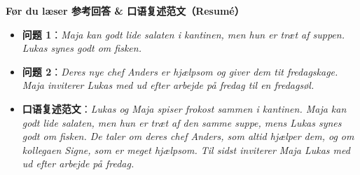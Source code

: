 \begin{answerbox}
\textbf{Før du læser 参考回答 \& 口语复述范文（Resumé）}
\begin{itemize}
  \item \textbf{问题 1}：\textit{Maja kan godt lide salaten i kantinen, men hun er træt af suppen. Lukas synes godt om fisken.}
  \item \textbf{问题 2}：\textit{Deres nye chef Anders er hjælpsom og giver dem tit fredagskage. Maja inviterer Lukas med ud efter arbejde på fredag til en fredagsøl.}
  \item \textbf{口语复述范文}：\textit{Lukas og Maja spiser frokost sammen i kantinen. Maja kan godt lide salaten, men hun er træt af den samme suppe, mens Lukas synes godt om fisken. De taler om deres chef Anders, som altid hjælper dem, og om kollegaen Signe, som er meget hjælpsom. Til sidst inviterer Maja Lukas med ud efter arbejde på fredag.}
\end{itemize}
\end{answerbox}
